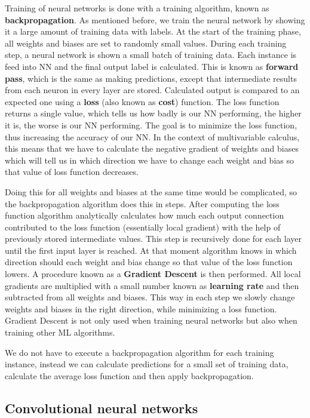 Training of neural networks is done with a training algorithm, known as \textbf{backpropagation}.
As mentioned before, we train the neural network by showing it a large amount of training data with labels.
At the start of the training phase, all weights and biases are set to randomly small values.
During each training step, a neural network is shown a small batch of training data. 
Each instance is feed into NN and the final output label is calculated.
This is known as \textbf{forward pass}, which is the same as making predictions, except that intermediate results from each neuron in every layer are stored.
Calculated output is compared to an expected one using a \textbf{loss} (also known as \textbf{cost}) function.
The loss function returns a single value, which tells us how badly is our NN performing, the higher it is, the worse is our NN performing.
The goal is to minimize the loss function, thus increasing the accuracy of our NN.
In the context of multivariable calculus, this means that we have to calculate the negative gradient of weights and biases which will tell us in which direction we have to change each weight and bias so that value of loss function decreases. 

Doing this for all weights and biases at the same time would be complicated, so the backpropagation algorithm does this in steps.
After computing the loss function algorithm analytically calculates how much each output connection contributed to the loss function (essentially local gradient) with the help of previously stored intermediate values.
This step is recursively done for each layer until the first input layer is reached.
At that moment algorithm knows in which direction should each weight and bias change so that value of the loss function lowers.
A procedure known as a \textbf{Gradient Descent} is then performed.
All local gradients are multiplied with a small number known as \textbf{learning rate} and then subtracted from all weights and biases.
This way in each step we slowly change weights and biases in the right direction, while minimizing a loss function.
Gradient Descent is not only used when training neural networks but also when training other ML algorithms.

We do not have to execute a backpropagation algorithm for each training instance, instead we can calculate predictions for a small set of training data, calculate the average loss function and then apply backpropagation.


\subsection{ Convolutional neural networks}


